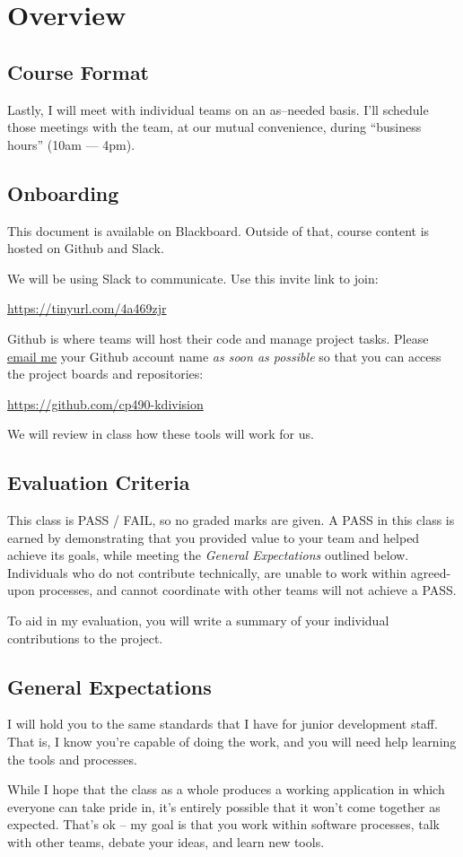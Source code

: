 \documentclass{article}
\newcommand{\enterProblemHeader}[1]{
}
\newcommand{\exitProblemHeader}[1]{
\nobreak\extramarks{#1}{}\nobreak
}
\newcounter{homeworkProblemCounter} %
\newcommand{\homeworkProblemName}{}
\newenvironment{homeworkProblem}[1][Problem \arabic{homeworkProblemCounter}]{ %
\stepcounter{homeworkProblemCounter} %
\renewcommand{\homeworkProblemName}{#1} %
\section{\homeworkProblemName} %
\enterProblemHeader{\homeworkProblemName} %
}{
\exitProblemHeader{\homeworkProblemName} %
}
\newcommand{\homeworkSectionName}{}
\newenvironment{homeworkSection}[1]{ %
\renewcommand{\homeworkSectionName}{#1} %
\subsection{\homeworkSectionName} %
\enterProblemHeader{\homeworkProblemName\ [\homeworkSectionName]} %
}{
\enterProblemHeader{\homeworkProblemName} %
}
\begin{document}
\begin{homeworkProblem}[Overview]
\begin{homeworkSection}{Course Format}
	Lastly, I will meet with individual teams on an as--needed basis. I'll schedule those meetings with the team, at our mutual convenience, during ``business hours'' (10am --- 4pm).
\end{homeworkSection}

\begin{homeworkSection}{Onboarding}
	This document is available on Blackboard. Outside of that, course content is hosted on Github and Slack.

	We will be using Slack to communicate. Use this invite link to join:

	\begin{center}
		\url{https://tinyurl.com/4a469zjr}
	\end{center}

	Github is where teams will host their code and manage project tasks. Please \href{mailto:dklein@confederationc.on.ca?subject=Github}{email me} your Github account name \textit{as soon as possible} so that you can access the project boards and repositories:

	\begin{center}
		\url{https://github.com/cp490-kdivision}
	\end{center}
	
	We will review in class how these tools will work for us.

\end{homeworkSection}

\begin{homeworkSection}{Evaluation Criteria}
	This class is PASS / FAIL, so no graded marks are given. A PASS in this class is earned by demonstrating that you provided value to your team and helped achieve its goals, while meeting the \textit{General Expectations} outlined below. Individuals who do not contribute technically, are unable to work within agreed-upon processes, and cannot coordinate with other teams will not achieve a PASS.
	
	To aid in my evaluation, you will write a summary of your individual contributions to the project.
\end{homeworkSection}


\begin{homeworkSection}{General Expectations}
	I will hold you to the same standards that I have for junior development staff. That is, I know you're capable of doing the work, and you will need help learning the tools and processes.

	While I hope that the class as a whole produces a working application in which everyone can take pride in, it's entirely possible that it won't come together as expected. That's ok -- my goal is that you work within software processes, talk with other teams, debate your ideas, and learn new tools.


\end{homeworkSection}
\end{homeworkProblem}
\end{document}
